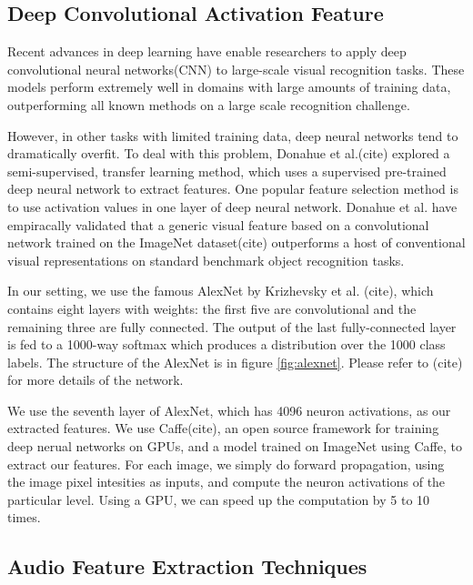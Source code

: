 \subsection{Deep Convolutional Activation Feature}
Recent advances in deep learning have enable researchers to apply deep convolutional neural networks(CNN) to large-scale visual recognition tasks. These models perform extremely well in domains with large amounts of training data, outperforming all known methods on a large scale recognition challenge.\par
However, in other tasks with limited training data, deep neural networks tend to dramatically overfit. To deal with this problem, Donahue et al.(cite) explored a semi-supervised, transfer learning method, which uses a supervised pre-trained deep neural network to extract features. One popular feature selection method is to use activation values in one layer of deep neural network. Donahue et al. have empiracally validated that a generic visual feature based on a convolutional network trained on the ImageNet dataset(cite) outperforms a host of conventional visual representations on standard benchmark object recognition tasks.\par
In our setting, we use the famous AlexNet by Krizhevsky et al. (cite), which contains eight layers with weights: the first five are convolutional and the remaining three are fully connected. The output of the last fully-connected layer is fed to a 1000-way softmax which produces a distribution over the 1000 class labels. The structure of the AlexNet is in figure \ref{fig:alexnet}. Please refer to (cite) for more details of the network. \par


We use the seventh layer of AlexNet, which has 4096 neuron activations, as our extracted features. We use Caffe(cite), an open source framework for training deep nerual networks on GPUs, and a model trained on ImageNet using Caffe, to extract our features. For each image, we simply do forward propagation, using the image pixel intesities as inputs, and compute the neuron activations of the particular level. Using a GPU, we can speed up the computation by 5 to 10 times.

\subsection{Audio Feature Extraction Techniques}
